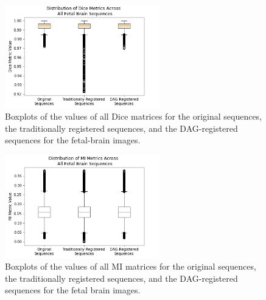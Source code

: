 \begin{figure}
\centering
\includegraphics[width=0.6\textwidth]{6/figures/fetal-brain-dice-box.png}
\caption{Boxplots of the values of all Dice matrices for the original sequences, the traditionally registered sequences, and the DAG-registered sequences for the fetal-brain images.}
\label{fig:fetal-brain-dice-box}
\end{figure}

\begin{figure}[h]
\centering
\includegraphics[width=0.6\textwidth]{6/figures/fetal-brain-mi-box.png}
\caption{Boxplots of the values of all MI matrices for the original sequences, the traditionally registered sequences, and the DAG-registered sequences for the fetal brain images.}
\label{fig:fetal-brain-mi-box}
\end{figure}

